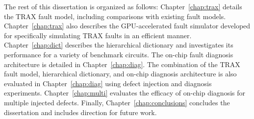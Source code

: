 The rest of this dissertation is organized as follows: Chapter~\ref{chap:trax} details the TRAX fault model, including comparisons with existing fault models.
%
Chapter~\ref{chap:trax} also describes the GPU-accelerated fault simulator developed for specifically simulating TRAX faults in an efficient manner.
%
Chapter~\ref{chap:dict} describes the hierarchical dictionary and investigates its performance for a variety of benchmark circuits.
%
The on-chip fault diagnosis architecture is detailed in Chapter~\ref{chap:diag}.
%
The combination of the TRAX fault model, hierarchical dictionary, and on-chip diagnosis architecture is also evaluated in Chapter~\ref{chap:diag} using defect injection and diagnosis experiments.
%
Chapter~\ref{chap:multi} evaluates the efficacy of on-chip diagnosis for multiple injected defects.
%
Finally, Chapter~\ref{chap:conclusions} concludes the dissertation and includes direction for future work.
